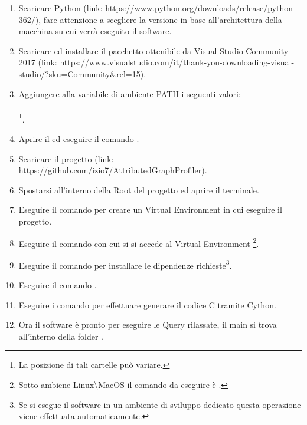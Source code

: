 \begin{enumerate}
\item Scaricare Python (link: https://www.python.org/downloads/release/python-362/), fare attenzione a scegliere la versione in base all'architettura della macchina su cui verrà eseguito il software.
\item Scaricare ed installare il pacchetto  ottenibile da Visual Studio Community 2017 (link: https://www.visualstudio.com/it/thank-you-downloading-visual-studio/?sku=Community\&rel=15).
\item Aggiungere alla variabile di ambiente PATH i seguenti valori:\\ \\
\footnote{La posizione di tali cartelle può variare.}.
\item Aprire il  ed eseguire il comando .
\item Scaricare il progetto (link: https://github.com/izio7/AttributedGraphProfiler).
\item Spostarsi all'interno della Root del progetto ed aprire il terminale.
\item Eseguire il comando  per creare un Virtual Environment in cui eseguire il progetto.
\item Eseguire il comando  con cui si si accede al Virtual Environment \footnote{Sotto ambiene Linux\textbackslash MacOS il comando da eseguire è .}.
\item Eseguire il comando  per installare le dipendenze richieste\footnote{Se si esegue il software in un ambiente di sviluppo dedicato questa operazione viene effettuata automaticamente.}.
\item Eseguire il comando .
\item Eseguire i comando  per effettuare generare il codice C tramite Cython.
\item Ora il software è pronto per eseguire le Query rilassate, il main si trova all'interno della folder .
\end{enumerate}
